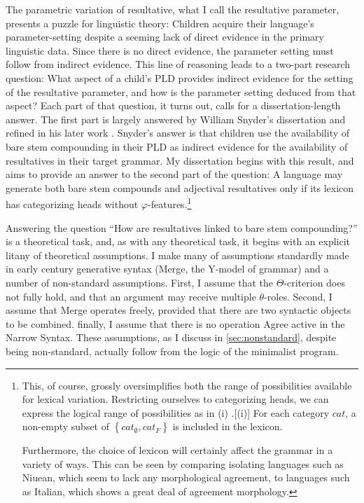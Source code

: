 \documentclass[MilwayThesis]{subfiles}
\begin{document}
The parametric variation of resultative, what I call the resultative parameter, presents a puzzle for linguistic theory:
Children acquire their language's parameter-setting despite a seeming lack of direct evidence in the primary linguistic data.
Since there is no direct evidence, the parameter setting must follow from indirect evidence.
This line of reasoning leads to a two-part research question:
What aspect of a child's PLD provides indirect evidence for the setting of the resultative parameter, and how is the parameter setting deduced from that aspect?
Each part of that question, it turns out, calls for a dissertation-length answer.
The first part is largely answered by William Snyder's dissertation \parencite{snyder1995language} and refined in his later work \parencite{snyder2001nature,snyder2012parameter,snyder2016compound}.
Snyder's answer is that children use the availability of bare stem compounding in their PLD as indirect evidence for the availability of resultatives in their target grammar.
My dissertation begins with this result, and aims to provide an answer to the second part of the question: 
A language may generate both bare stem compounds and adjectival resultatives only if its lexicon has categorizing heads without $\varphi$-features.\footnote{
	This, of course, grossly oversimplifies both the range of possibilities available for lexical variation.
	Restricting ourselves to categorizing heads, we can express the logical range of possibilities as in (i)
	\ex.[(i)] For each category $cat$, a non-empty subset of $\left\{ cat_{\emptyset}, cat_{F} \right\}$ is included in the lexicon.

	Furthermore, the choice of lexicon will certainly affect the grammar in a variety of ways.
	This can be seen by comparing isolating languages such as Niuean, which seem to lack any morphological agreement, to languages such as Italian, which shows a great deal of agreement morphology.
}

Answering the question ``How are resultatives linked to bare stem compounding?'' is a theoretical task, and, as with any theoretical task, it begins with an explicit litany of theoretical assumptions.
I make many of assumptions standardly made in early  century generative syntax (Merge, the Y-model of grammar) and a number of non-standard assumptions.
First, I assume that the $\Theta$-criterion does not fully hold, and that an argument may receive multiple $\theta$-roles.
Second, I assume that Merge operates freely, provided that there are two syntactic objects to be combined.
finally, I assume that there is no operation Agree active in the Narrow Syntax.
These assumptions, as I discuss in \cref{sec:nonstandard}, despite being non-standard, actually follow from the logic of the minimalist program.
\end{document}
